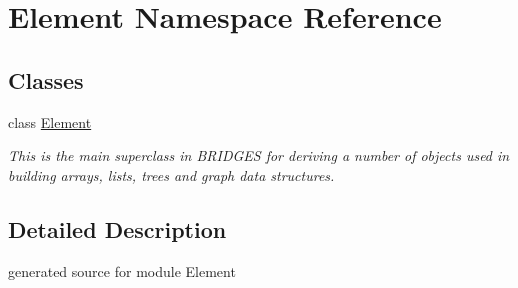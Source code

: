 \hypertarget{namespace_element}{}\section{Element Namespace Reference}
\label{namespace_element}
\subsection*{Classes}
\begin{DoxyCompactItemize}
\item 
class \hyperlink{class_element_1_1_element}{Element}
\begin{DoxyCompactList}\small\item\em This is the main superclass in B\+R\+I\+D\+G\+ES for deriving a number of objects used in building arrays, lists, trees and graph data structures. \end{DoxyCompactList}\end{DoxyCompactItemize}


\subsection{Detailed Description}
\begin{DoxyVerb}generated source for module Element \end{DoxyVerb}
 